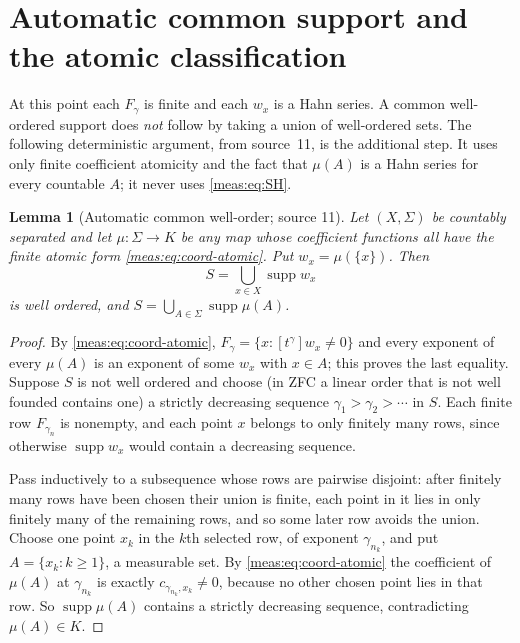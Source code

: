 \documentclass[11pt]{article}
\numberwithin{equation}{section}
\newtheorem{lemma}[theorem]{Lemma}
\theoremstyle{definition}
\theoremstyle{remark}
\newcommand{\supp}{\operatorname{supp}}
\newcommand{\coef}[2]{[t^{#1}]#2}
\begin{document}
\section{Automatic common support and the atomic classification}
\label{meas:sec:atomic}

At this point each $F_\gamma$ is finite and each $w_x$ is a Hahn series. A
common well-ordered support does \emph{not} follow by taking a union of
well-ordered sets. The following deterministic argument, from source~11, is
the additional step. It uses only finite coefficient atomicity and the fact
that $\mu(A)$ is a Hahn series for every countable $A$; it never uses
\eqref{meas:eq:SH}.

\begin{lemma}[Automatic common well-order; source 11]\label{meas:lem:global}
Let $(X,\Sigma)$ be countably separated and let $\mu:\Sigma\to K$ be any map
whose coefficient functions all have the finite atomic form
\eqref{meas:eq:coord-atomic}. Put $w_x=\mu(\{x\})$. Then
\[
 S=\bigcup_{x\in X}\supp w_x
\]
is well ordered, and $S=\bigcup_{A\in\Sigma}\supp\mu(A)$.
\end{lemma}
\begin{proof}
By \eqref{meas:eq:coord-atomic}, $F_\gamma=\{x:\coef{\gamma}{w_x}\ne0\}$ and every
exponent of every $\mu(A)$ is an exponent of some $w_x$ with $x\in A$; this
proves the last equality. Suppose $S$ is not well ordered and choose (in ZFC a
linear order that is not well founded contains one) a strictly decreasing
sequence $\gamma_1>\gamma_2>\cdots$ in $S$. Each finite row $F_{\gamma_n}$ is
nonempty, and each point $x$ belongs to only finitely many rows, since
otherwise $\supp w_x$ would contain a decreasing sequence.

Pass inductively to a subsequence whose rows are pairwise disjoint: after
finitely many rows have been chosen their union is finite, each point in it
lies in only finitely many of the remaining rows, and so some later row avoids
the union. Choose one point $x_k$ in the $k$th selected row, of exponent
$\gamma_{n_k}$, and put $A=\{x_k:k\ge1\}$, a measurable set. By
\eqref{meas:eq:coord-atomic} the coefficient of $\mu(A)$ at $\gamma_{n_k}$ is
exactly $c_{\gamma_{n_k},x_k}\ne0$, because no other chosen point lies in that
row. So $\supp\mu(A)$ contains a strictly decreasing sequence, contradicting
$\mu(A)\in K$.
\end{proof}
\end{document}
